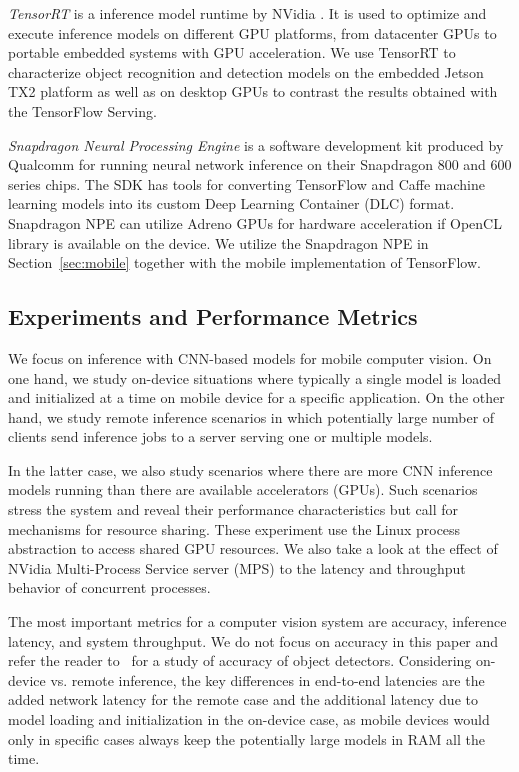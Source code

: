 \documentclass[sigconf]{acmart}
\begin{document}
\textit{TensorRT} is a inference model runtime by NVidia \cite{tensorrt}. It is used to optimize and execute inference models on different GPU platforms, from datacenter GPUs to portable embedded systems with GPU acceleration. We use TensorRT to characterize object recognition and detection models on the embedded Jetson TX2 platform as well as on desktop GPUs to contrast the results obtained with the TensorFlow Serving.

\textit{Snapdragon Neural Processing Engine}\cite{snpe} is a software development kit produced by Qualcomm for running neural network inference on their Snapdragon 800 and 600 series chips. The SDK has tools for converting TensorFlow and Caffe machine learning models into its custom Deep Learning Container (DLC) format. Snapdragon NPE can utilize Adreno GPUs for hardware acceleration if OpenCL library is available on the device. We utilize the Snapdragon NPE in Section~\ref{sec:mobile} together with the mobile implementation of TensorFlow.

\subsection{Experiments and Performance Metrics}

We focus on inference with CNN-based models for mobile computer vision. On one hand, we study on-device situations where typically a single model is loaded and initialized at a time on mobile device for a specific application. On the other hand, we study remote inference scenarios in which potentially large number of clients send inference jobs to a server serving one or multiple models.

In the latter case, we also study scenarios where there are more CNN inference models running than there are available accelerators (GPUs). Such scenarios stress the system and reveal their performance characteristics but call for mechanisms for resource sharing.
These experiment use the Linux process abstraction to access shared GPU resources.
We also take a look at the effect of NVidia Multi-Process Service server (MPS)\cite{mps} to the latency and throughput behavior of concurrent processes.


The most important metrics for a computer vision system are accuracy, inference latency, and system throughput.
We do not focus on accuracy in this paper and refer the reader to~\cite{Huang2017CVPR} for a study of accuracy of object detectors. Considering on-device vs. remote inference, the key differences in end-to-end latencies are the added network latency for the remote case and the additional latency due to model loading and initialization in the on-device case, as mobile devices would only in specific cases always keep the potentially large models in RAM all the time.
\end{document}
